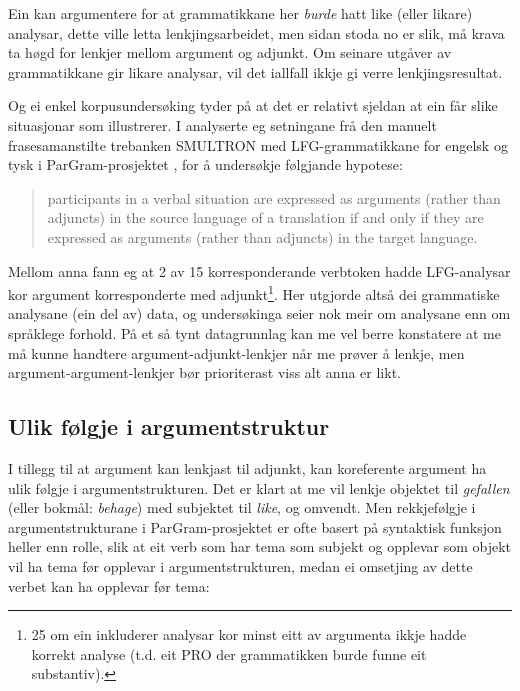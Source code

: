 \documentclass[12pt,a4paper,oneside,draft]{report}
\begin{document}
Ein kan argumentere for at grammatikkane her \emph{burde} hatt like (eller
likare) analysar, dette ville letta lenkjingsarbeidet, men sidan stoda
no er slik, må krava ta høgd for lenkjer mellom argument og
adjunkt. Om seinare utgåver av grammatikkane gir likare analysar, vil
det iallfall ikkje gi verre lenkjingsresultat.

Og ei enkel korpusundersøking tyder på at det er relativt sjeldan at
ein får slike situasjonar som \Last illustrerer.  I
\citet{unhammer2009aaa} analyserte eg setningane frå den manuelt
frasesamanstilte trebanken SMULTRON \citep{samuelsson2006pap} med
LFG-grammatikkane for engelsk og tysk i ParGram-prosjektet
\citep{butt2002pgp}, for å undersøkje følgjande hypotese:
\begin{quote}
participants in a verbal situation are expressed as
arguments (rather than adjuncts) in the source language of a
translation if and only if they are expressed as arguments (rather
than adjuncts) in the target language.
\end{quote}

Mellom anna fann eg at 2 av 15 korresponderande verbtoken hadde
LFG-analysar kor argument korresponderte med adjunkt\footnote{25 om ein inkluderer analysar kor minst eitt av argumenta
        ikkje hadde korrekt analyse (t.d. eit \textsc{PRO} der
        grammatikken burde funne eit substantiv). }. Her
utgjorde altså dei grammatiske analysane (ein del av) data, og
undersøkinga seier nok meir om analysane enn om språklege forhold. På
et så tynt datagrunnlag kan me vel berre konstatere at me må kunne
handtere argument-adjunkt-lenkjer når me prøver å lenkje, men
argument-argument-lenkjer bør prioriterast viss alt anna er likt.

\subsection{Ulik følgje i argumentstruktur}
\label{sec-3.6.2}

I tillegg til at argument kan lenkjast til adjunkt, kan koreferente
argument ha ulik følgje i argumentstrukturen. Det er klart at me vil
lenkje objektet til \emph{gefallen} (eller bokmål: \emph{behage}) med subjektet
til \emph{like}, og omvendt.  Men rekkjefølgje i argumentstrukturane i
ParGram-prosjektet er ofte basert på syntaktisk funksjon heller enn
rolle, slik at eit verb som har tema som subjekt og opplevar som
objekt vil ha tema før opplevar i argumentstrukturen, medan ei
omsetjing av dette verbet kan ha opplevar før tema:
\end{document}
